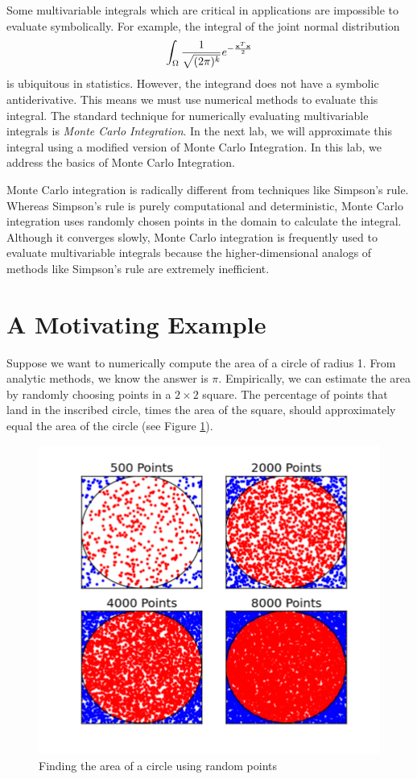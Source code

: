 
Some multivariable integrals which are critical in applications are impossible to evaluate symbolically.
For example, the integral of the joint normal distribution
\[
\int_{\Omega} \frac{1}{\sqrt{(2 \pi)^k}} e^{- \frac{\bold{x}^T\bold{x}}{2}}
\]
is ubiquitous in statistics.
However, the integrand does not have a symbolic antiderivative.
This means we must use numerical methods to evaluate this integral. The standard technique for numerically evaluating multivariable integrals is \emph{Monte Carlo Integration}. In the next lab, we will approximate this integral using a modified version of Monte Carlo Integration. In this lab, we address the basics of Monte Carlo Integration.

Monte Carlo integration is radically different from techniques like Simpson's rule. Whereas Simpson's rule is purely computational and deterministic, Monte Carlo integration uses randomly chosen points  in the domain to calculate the integral.
Although it converges slowly, Monte Carlo integration is frequently used to evaluate multivariable integrals because the higher-dimensional analogs of methods like Simpson's rule are extremely inefficient.

\section*{A Motivating Example} %

Suppose we want to numerically compute the area of a circle of radius 1.
From analytic methods, we know the answer is $\pi$.
Empirically, we can estimate the area by randomly choosing points in a $2 \times 2$ square.
The percentage of points that land in the inscribed circle, times the area of the square, should approximately equal the area of the circle (see Figure \ref{fig:MCCircle}).

\begin{figure}
\includegraphics[width=.7\textwidth]{figures/MC.pdf}
\caption{Finding the area of a circle using random points}
\label{fig:MCCircle}
\end{figure}

